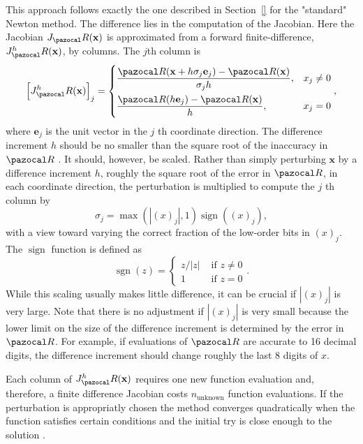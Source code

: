 This approach follows exactly the one described in Section~\ref{} for the "standard" Newton method.
The difference lies in the computation of the Jacobian.
Here the Jacobian \(J_\pazocal R(\mathbf x)\) is approximated from a forward finite-difference, \(J^h_\pazocal R(\mathbf x)\), by columns.
The \(j\)th column is
\begin{equation}
\left[J^h_\pazocal R(\mathbf x)\right]_{j}=
\begin{cases}
  \displaystyle\frac{\pazocal R(\mathbf x + h \sigma_{j} \mathbf e_{j})-\pazocal R(\mathbf x)}{\sigma_{j} h}, & x_{j} \neq 0 \\[10pt]
  \displaystyle\frac{\pazocal R(h \mathbf e_{j})-\pazocal R(\mathbf x)}{h}, & x_{j}=0
\end{cases},
\end{equation}
where \(\mathbf e_{j}\) is the unit vector in the \(j\) th coordinate direction.
The difference increment \(h\) should be no smaller than the square root of the inaccuracy in \(\pazocal R\) \citep{kelley_solving_2003}.
It should, however, be scaled.
Rather than simply perturbing \(\mathbf x\) by a difference increment \(h\), roughly the square root of the error in \(\pazocal R\), in each coordinate direction, the perturbation is multiplied to compute the \(j\) th column by
\begin{equation}
  \sigma_j = \max (|(x)_{j}|, 1) \operatorname{sign}((x)_{j}),
\end{equation}
with a view toward varying the correct fraction of the low-order bits in \((x)_{j}\).
The \(\operatorname{sign}\) function is defined as
\begin{equation}
  \operatorname{sgn}(z)=\begin{cases}
  z /|z| & \text { if } z \neq 0 \\
  1 & \text { if } z=0
  \end{cases}.
\end{equation}
While this scaling usually makes little difference, it can be crucial if \(|(x)_{j}|\) is very large.
Note that there is no adjustment if \(|(x)_{j}|\) is very small because the lower limit on the size of the difference increment is determined by the error in \(\pazocal R\).
For example, if evaluations of \(\pazocal R\) are accurate to 16 decimal digits, the difference increment should change roughly the last 8 digits of \(x\). \citep{kelley_solving_2003}

Each column of \(J^h_\pazocal R(\mathbf x)\) requires one new function evaluation and, therefore, a finite difference Jacobian costs \(n_\text{unknown}\) function evaluations.
If the perturbation is appropriatly chosen the method converges quadratically when the function satisfies certain conditions and the initial try is close enough to the solution \citep{dennis}.

